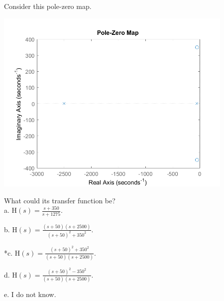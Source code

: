 
Consider this pole-zero map.

\includegraphics[width=4.51866in,height=3.51574in]{../../Images/PolesAndZeroesQ2.png}

What could its transfer function be? \\

a.\(\text{\ H}\left( s \right) = \frac{s + 350}{s + 1275}\).

b.\(\text{\ H}\left( s \right) = \frac{(s + 50)(s + 2500)}{\left( s + 50 \right)^{2} + 350^{2}}\).

*c.\(\text{\ H}\left( s \right) = \frac{\left( s + 50 \right)^{2} + 350^{2}}{\left( s + 50 \right)\left( s + 2500 \right)}\).

d.\(\text{\ H}\left( s \right) = \frac{\left( s + 50 \right)^{2} - 350^{2}}{\left( s + 50 \right)\left( s + 2500 \right)}\).

e. I do not know. \\
